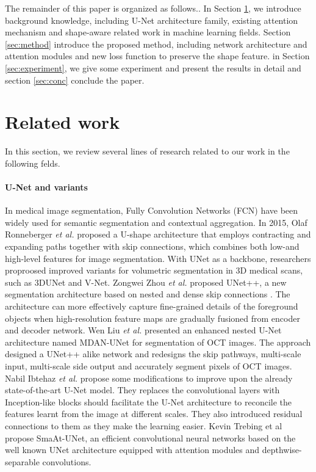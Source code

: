 \documentclass{ieeeaccess}
\begin{document}
  The remainder of this paper is organized as follows.. In Section \ref{sec:related}, we introduce background knowledge, including U-Net architecture family, existing attention mechanism and shape-aware related work in machine learning fields. Section \ref{sec:method} introduce the proposed method, including network architecture and attention modules and new loss function to preserve the shape feature. in Section \ref{sec:experiment}, we give some experiment and present the results in detail and section \ref{sec:conc} conclude the paper.
  
  \section{Related work}\label{sec:related}
  In this section, we review several lines of research related to our work in the following felds.
  \paragraph{U-Net and variants} In medical image segmentation, Fully Convolution Networks (FCN) have been widely used for semantic segmentation and contextual aggregation. In 2015, Olaf Ronneberger \emph{et al.} proposed a U-shape architecture that employs contracting and expanding paths together with skip connections, which combines both low-and high-level features for image segmentation\cite{RonnebergerFB15}. With UNet as a backbone, researchers proproosed improved variants for volumetric segmentation in 3D medical scans, such as 3DUNet\cite{CicekALBR16} and V-Net\cite{MilletariNA16}. Zongwei Zhou \emph{et al.} proposed UNet++, a new segmentation architecture based on nested and dense skip connections \cite{ZhouRTL18}. The architecture can more effectively capture fine-grained details of the foreground objects when high-resolution feature maps are gradually fusioned from encoder and decoder network. Wen Liu \emph{et al.} presented an enhanced nested U-Net architecture named MDAN-UNet for segmentation of OCT images\cite{LiuSJ20}. The approach designed a UNet++ alike network and redesigns the skip pathways, multi-scale input, multi-scale side output and accurately segment pixels of OCT images. Nabil Ibtehaz \emph{et al.} propose some modifications to improve upon the already state-of-the-art U-Net model\cite{IbtehazR20}. They replaces the convolutional layers with Inception-like blocks should facilitate the U-Net architecture to reconcile the features learnt from the image at different scales. They also introduced residual connections to them as they make the learning easier. Kevin Trebing et al propose SmaAt-UNet, an efficient convolutional neural networks based on the well known UNet architecture equipped with attention modules and depthwise-separable convolutions\cite{TrebinM20}.    
  
\end{document}
